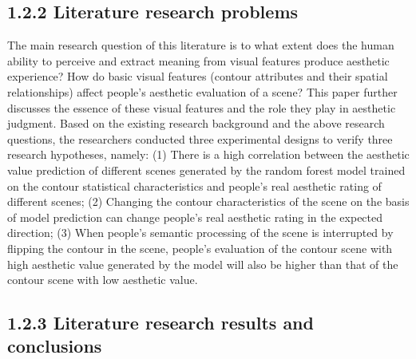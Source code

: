 \documentclass[
  man,floatsintext]{apa6}
\begin{document}
\subsection{1.2.2 Literature research problems}\label{literature-research-problems}

The main research question of this literature is to what extent does the human ability to perceive and extract meaning from visual features produce aesthetic experience? How do basic visual features (contour attributes and their spatial relationships) affect people's aesthetic evaluation of a scene? This paper further discusses the essence of these visual features and the role they play in aesthetic judgment. Based on the existing research background and the above research questions, the researchers conducted three experimental designs to verify three research hypotheses, namely: (1) There is a high correlation between the aesthetic value prediction of different scenes generated by the random forest model trained on the contour statistical characteristics and people's real aesthetic rating of different scenes; (2) Changing the contour characteristics of the scene on the basis of model prediction can change people's real aesthetic rating in the expected direction; (3) When people's semantic processing of the scene is interrupted by flipping the contour in the scene, people's evaluation of the contour scene with high aesthetic value generated by the model will also be higher than that of the contour scene with low aesthetic value.

\subsection{1.2.3 Literature research results and conclusions}\label{literature-research-results-and-conclusions}
\end{document}
